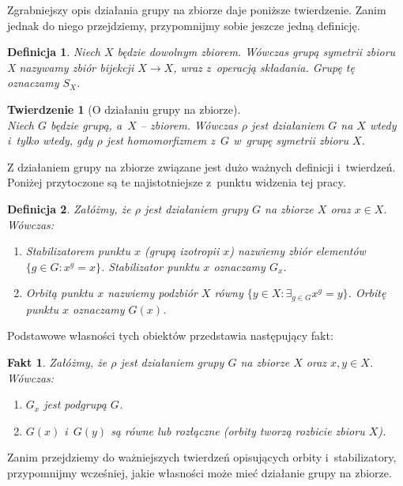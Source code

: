 \documentclass[licencjacka]{pracamgr}
\newtheorem{deff}{Definicja}[section]
\newtheorem{thh}{Twierdzenie}[section]
\newtheorem{fact}{Fakt}[section]
\begin{document}
Zgrabniejszy opis działania grupy na zbiorze daje poniższe twierdzenie.
Zanim jednak do niego przejdziemy, przypomnijmy sobie jeszcze jedną definicję.

\begin{deff}
	Niech $X$ będzie dowolnym zbiorem. Wówczas \emph{grupą symetrii zbioru X} nazywamy zbiór bijekcji $X \to X$,
	wraz z~operacją składania. Grupę tę oznaczamy $S_X$.
\end{deff}

\begin{thh}[O działaniu grupy na zbiorze] $ $ \\
	Niech $G$ będzie grupą, a~$X$ -- zbiorem. Wówczas $\rho$ jest działaniem $G$ na $X$ wtedy i~tylko wtedy, 
	gdy $\rho$ jest homomorfizmem z~$G$ w~grupę symetrii zbioru $X$.
\end{thh}

Z działaniem grupy na zbiorze związane jest dużo ważnych definicji i~twierdzeń.
Poniżej przytoczone są te najistotniejsze z~punktu widzenia tej pracy.

\begin{deff}
	Załóżmy, że $\rho$ jest działaniem grupy $G$ na zbiorze $X$ oraz $x \in X$. Wówczas:
	\begin{enumerate}[label=\alph*)]
	 \item \emph{Stabilizatorem punktu $x$ (grupą izotropii $x$)} nazwiemy zbiór elementów $\{g \in G\colon x^g = x \}$. 
					Stabilizator punktu $x$ oznaczamy $G_x$.
	 \item \emph{Orbitą punktu $x$} nazwiemy podzbiór $X$ równy $\{y \in X \colon \exists_{g \in G} x^g = y \}$.
					Orbitę punktu $x$ oznaczamy $G(x)$.
	\end{enumerate}
\end{deff}

Podstawowe własności tych obiektów przedstawia następujący fakt:
\begin{fact}
	Załóżmy, że $\rho$ jest działaniem grupy $G$ na zbiorze $X$ oraz $x, y \in X$. Wówczas:
	\begin{enumerate}[label=\alph*)]
	 \item $G_x$ jest podgrupą $G$.
	 \item $G(x)$ i~$G(y)$ są równe lub rozłączne (orbity tworzą rozbicie zbioru $X$).
	\end{enumerate}
\end{fact}

Zanim przejdziemy do ważniejszych twierdzeń opisujących orbity i~stabilizatory, 
przypomnijmy wcześniej, jakie własności może mieć działanie grupy na zbiorze.
\end{document}
